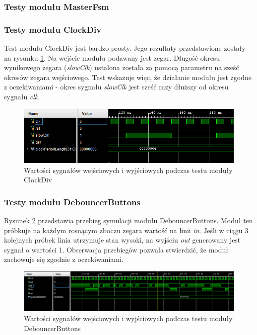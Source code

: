 \documentclass[12pt] {article}
\begin{document}
\subsubsection{Testy modułu MasterFsm}



\subsubsection{Testy modułu ClockDiv}
Test modułu ClockDiv jest bardzo prosty. Jego rezultaty przedstawione zostały na rysunku \ref{fig:behavClockDiv}. Na wejście modułu podawany jest zegar. Długość okresu wynikowego zegara (\textit{slowClk}) ustalona została za pomocą parametru na sześć okresów zegara wejściowego. Test wskazuje więc, że działanie modułu jest zgodne z oczekiwaniami - okres sygnału \textit{slowClk} jest sześć razy dłuższy od okresu sygnału \textit{clk}.

\begin{figure}[H]
\centering
\includegraphics[width=\textwidth]{res/behav_sims/ClkDiv_behavSim_1.png}
\caption{Wartości sygnałów wejściowych i wyjściowych podczas testu moduły ClockDiv}
\label{fig:behavClockDiv}
\end{figure}


\subsubsection{Testy modułu DebouncerButtons}
Rysunek \ref{fig:behavDebounderButtons} przedstawia przebieg symulacji modułu DebouncerButtons. Moduł ten próbkuje na każdym rosnącym zboczu zegara wartość na linii \textit{in}. Jeśli w ciągu 3 kolejnych próbek linia utrzymuje stan wysoki, na wyjściu \textit{out} generowany jest sygnał o wartości 1. Obserwacja przebiegów pozwala stwierdzić, że moduł zachowuje się zgodnie z oczekiwaniami.

\begin{figure}[H]
\centering
\includegraphics[width=\textwidth]{res/behav_sims/DebouncerButtons_behavSim_1.png}
\caption{Wartości sygnałów wejściowych i wyjściowych podczas testu moduły DebouncerButtons}
\label{fig:behavDebounderButtons}
\end{figure}
\end{document}
